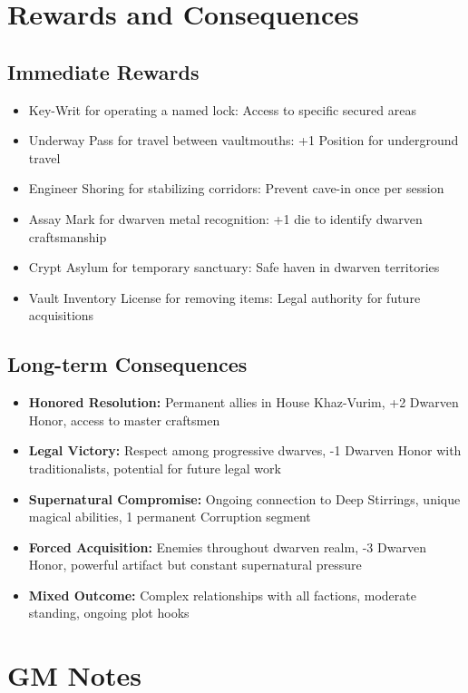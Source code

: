 \documentclass[11pt]{article}
\begin{document}
\section{Rewards and Consequences}

\subsection{Immediate Rewards}
\begin{itemize}
\item Key-Writ for operating a named lock: Access to specific secured areas
\item Underway Pass for travel between vaultmouths: +1 Position for underground travel
\item Engineer Shoring for stabilizing corridors: Prevent cave-in once per session
\item Assay Mark for dwarven metal recognition: +1 die to identify dwarven craftsmanship
\item Crypt Asylum for temporary sanctuary: Safe haven in dwarven territories
\item Vault Inventory License for removing items: Legal authority for future acquisitions
\end{itemize}

\subsection{Long-term Consequences}
\begin{itemize}
\item \textbf{Honored Resolution:} Permanent allies in House Khaz-Vurim, +2 Dwarven Honor, access to master craftsmen
\item \textbf{Legal Victory:} Respect among progressive dwarves, -1 Dwarven Honor with traditionalists, potential for future legal work
\item \textbf{Supernatural Compromise:} Ongoing connection to Deep Stirrings, unique magical abilities, 1 permanent Corruption segment
\item \textbf{Forced Acquisition:} Enemies throughout dwarven realm, -3 Dwarven Honor, powerful artifact but constant supernatural pressure
\item \textbf{Mixed Outcome:} Complex relationships with all factions, moderate standing, ongoing plot hooks
\end{itemize}

\section{GM Notes}
\end{document}
